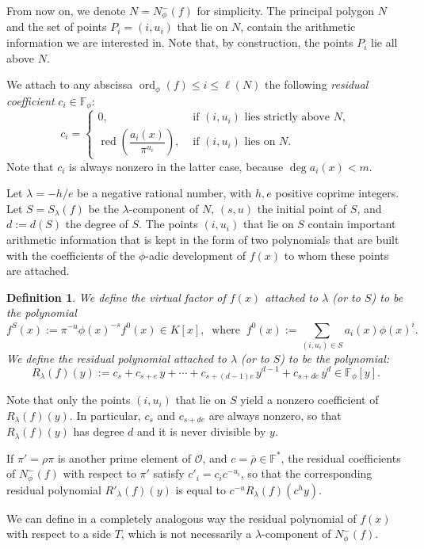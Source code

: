 \documentclass{amsart}
\newtheorem{definition}[theorem]{Definition}
\def\op{\operatorname}
\def\as#1{\renewcommand\arraystretch{#1}}
\def\dg{\op{deg}}
\def\ff#1{\mathbb{F}_{#1}}
\def\fph{\mathbb{F}_{\phi}}
\def\la{\lambda}
\def\npp#1{N_{\phi}^-(#1)}
\def\oo{{\mathcal O}}
\def\ord{\op{ord}}
\def\rd{\op{red}}
\begin{document}
From now on, we denote $N=\npp{f}$ for simplicity. The principal polygon $N$ and the set of points $P_i=(i,u_i)$ that lie on $N$, contain the arithmetic information we are interested in. 
Note that, by construction, the points $P_i$ lie all above $N$.

We attach to any abscissa $\ord_{\phi}(f)\le i\le \ell(N)$ the following \emph{residual coefficient} $c_i\in\fph$:
$$\as{1.6}
c_i=\left\{\begin{array}{ll}
0,&\mbox{ if $(i,u_i)$ lies strictly above }N,\\\rd\left(\dfrac{a_i(x)}{\pi^{u_i}}\right),&\mbox{ if $(i,u_i)$ lies on }N.
\end{array}
\right.
$$ Note that $c_i$ is always nonzero in the latter case, because $\dg a_i(x)<m$. 

Let $\la=-h/e$ be a negative rational number, with $h,e$ positive coprime integers. Let $S=S_{\la}(f)$ be the $\la$-component of $N$, $(s,u)$ the initial point of $S$, and $d:=d(S)$ the degree of $S$. The points $(i,u_i)$ that lie on $S$ contain important arithmetic information that is
kept in the form of two polynomials that are built with the
coefficients of the $\phi$-adic development of $f(x)$ to whom these points are attached.

\begin{definition}
We define the \emph{virtual factor} of $f(x)$ attached to $\la$ (or to $S$) to be the polynomial
$$
f^S(x):=\pi^{-u}\phi(x)^{-s}f^0(x)\in K[x],\ \mbox{ where }\ f^0(x):=\sum_{(i,u_i)\in S}a_{i}(x)\phi(x)^i.
$$
We define the \emph{residual polynomial} attached to $\la$ (or to $S$) to be the polynomial:
$$
R_{\la}(f)(y):=c_s+c_{s+e}\,y+\cdots+c_{s+(d-1)e}\,y^{d-1}+c_{s+de}\,y^d\in\fph[y].
$$
\end{definition}

Note that only the points $(i,u_i)$ that lie on $S$ yield a nonzero coefficient of $R_{\la}(f)(y)$. In particular, $c_s$ and $c_{s+de}$ are always nonzero, so that $R_{\la}(f)(y)$ has degree $d$ and it is never  divisible by $y$.

If $\pi'=\rho\pi$ is another prime element of $\oo$, and $c=\bar{\rho}\in\ff{}^*$, the residual coefficients of $N_{\phi}^-(f)$ with respect to $\pi'$ satisfy $c'_i=c_ic^{-u_i}$, so that the corresponding residual polynomial $R'_{\la}(f)(y)$ is equal to $c^{-u}R_{\la}(f)(c^hy)$. 


We can define in a completely analogous way the residual polynomial of $f(x)$ with respect to a side $T$, which is not necessarily a $\la$-component of $\npp{f}$. 
\end{document}

